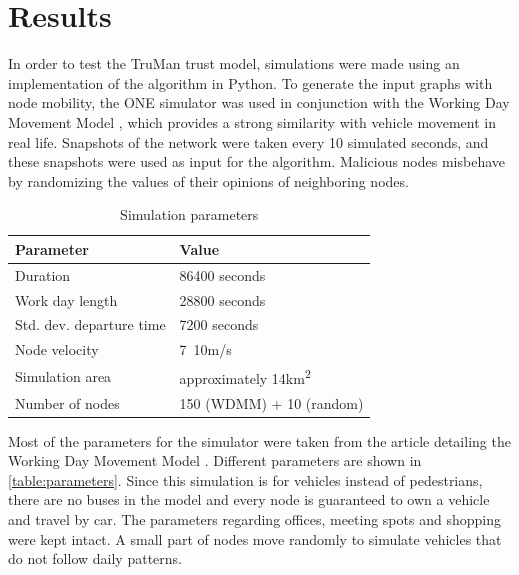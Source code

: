 \documentclass[conference]{IEEEtran}
\begin{document}
\section{Results}
\label{section:results}

In order to test the TruMan trust model, simulations were made using an implementation of the algorithm in Python.
To generate the input graphs with node mobility, the ONE simulator \cite{keranen2009one} was used in conjunction with the Working Day Movement Model \cite{ekman2008working}, which provides a strong similarity with vehicle movement in real life.
Snapshots of the network were taken every 10 simulated seconds, and these snapshots were used as input for the algorithm.
Malicious nodes misbehave by randomizing the values of their opinions of neighboring nodes.

\begin{table}[h!]
\caption{Simulation parameters}
\label{table:parameters}
\centering
\begin{tabular}{|p{3cm}||p{3.5cm}|}
 \hline
 \textbf{Parameter}	& \textbf{Value} \\
 \hline
 \hline
 Duration 			& 86400 seconds \\
 \hline
 Work day length 	& 28800 seconds \\
 \hline
 Std. dev. departure time & 7200 seconds \\
 \hline
 Node velocity 		& 7~10m/s \\
 \hline
 Simulation area	& approximately 14km\textsuperscript{2} \\
 \hline
 Number of nodes 	& 150 (WDMM) + 10 (random) \\
 \hline
\end{tabular}
\end{table}

Most of the parameters for the simulator were taken from the article detailing the Working Day Movement Model \cite{ekman2008working}.
Different parameters are shown in \autoref{table:parameters}.
Since this simulation is for vehicles instead of pedestrians, there are no buses in the model and every node is guaranteed to own a vehicle and travel by car.
The parameters regarding offices, meeting spots and shopping were kept intact.
A small part of nodes move randomly to simulate vehicles that do not follow daily patterns.
\end{document}
